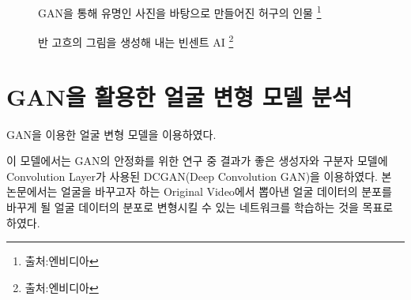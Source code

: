 \documentclass{oblivoir}
\begin{document}
\begin{figure}[h!]
\centering
\caption{GAN을 통해 유명인 사진을 바탕으로 만들어진 허구의 인물 \protect\footnote{출처:엔비디아}}
\end{figure}


\begin{figure}[h!]
\centering
\caption{반 고흐의 그림을 생성해 내는 빈센트 AI \protect\footnote{출처:엔비디아}}
\end{figure}


\section{ GAN을 활용한 얼굴 변형 모델 분석}

GAN을 이용한 얼굴 변형 모델\cite{reference11}을 이용하였다.

이 모델에서는 GAN의 안정화를 위한 연구 중 결과가 좋은 생성자와 구분자 모델에 Convolution Layer가 사용된 DCGAN(Deep Convolution GAN)을 이용하였다. 본 논문에서는 얼굴을 바꾸고자 하는 Original Video에서 뽑아낸 얼굴 데이터의 분포를 바꾸게 될 얼굴 데이터의 분포로 변형시킬 수 있는 네트워크를 학습하는 것을 목표로 하였다.
\end{document}
